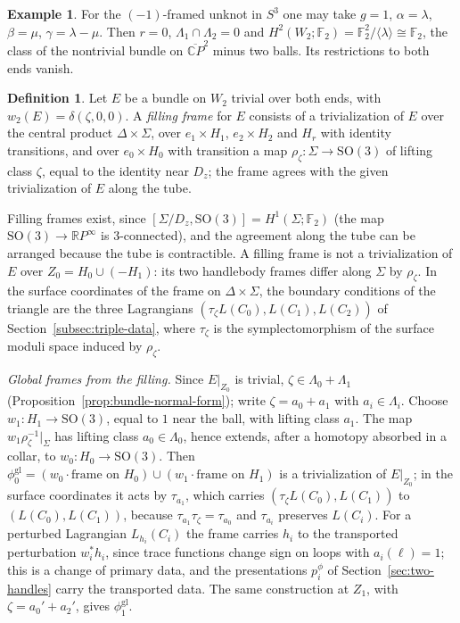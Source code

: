 \documentclass[11pt]{amsart}
\theoremstyle{definition}
\newtheorem{definition}[theorem]{Definition}
\newtheorem{example}[theorem]{Example}
\theoremstyle{remark}
\theoremstyle{plain}
\numberwithin{equation}{section}
\newcommand{\RR}{\mathbb{R}}
\newcommand{\CC}{\mathbb{C}}
\newcommand{\FF}{\mathbb{F}_2}
\newcommand{\SO}{\mathrm{SO}}
\begin{document}
\begin{example}
For the $(-1)$-framed unknot in $S^3$ one may take $g=1$,
$\alpha=\lambda$, $\beta=\mu$, $\gamma=\lambda-\mu$. Then $r=0$,
$\Lambda_1\cap \Lambda_2=0$ and $H^2(W_2;\FF)=\FF^2/\langle\lambda\rangle\cong\FF$,
the class of the nontrivial bundle on $\overline{\CC P}^2$ minus two
balls. Its restrictions to both ends vanish.
\end{example}

\begin{definition}\label{def:normal-form}
Let $E$ be a bundle on $W_2$ trivial over both ends, with
$w_2(E)=\delta(\zeta,0,0)$. A \emph{filling frame} for $E$ consists of a
trivialization of $E$ over the central product $\Delta\times\Sigma$, over
$e_1\times H_1$, $e_2\times H_2$ and $H_r$ with identity transitions, and
over $e_0\times H_0$ with transition a map $\rho_\zeta\colon\Sigma\to\SO(3)$ of
lifting class $\zeta$, equal to the identity near $D_z$; the frame agrees with
the given trivialization of $E$ along the tube.
\end{definition}

Filling frames exist, since $[\Sigma/D_z,\SO(3)]=H^1(\Sigma;\FF)$ (the map
$\SO(3)\to\RR P^\infty$ is $3$-connected), and the agreement along the tube can be
arranged because the tube is contractible. A filling frame is not a
trivialization of $E$ over $Z_0=H_0\cup(-H_1)$: its two handlebody frames
differ along $\Sigma$ by $\rho_\zeta$. In the surface coordinates of the frame
on $\Delta\times\Sigma$, the boundary conditions of the triangle are the three
Lagrangians $(\tau_\zeta L(C_0),L(C_1),L(C_2))$ of
Section~\ref{subsec:triple-data}, where $\tau_\zeta$ is the symplectomorphism
of the surface moduli space induced by $\rho_\zeta$.

\emph{Global frames from the filling.} Since $E|_{Z_0}$ is trivial,
$\zeta\in \Lambda_0+\Lambda_1$ (Proposition~\ref{prop:bundle-normal-form}); write
$\zeta=a_0+a_1$ with $a_i\in \Lambda_i$. Choose $w_1\colon H_1\to\SO(3)$, equal to $1$
near the ball, with lifting class $a_1$. The map $w_1\rho_\zeta^{-1}|_\Sigma$ has
lifting class $a_0\in \Lambda_0$, hence extends, after a homotopy absorbed in a collar,
to $w_0\colon H_0\to\SO(3)$. Then $\phi_0^{\mathrm{gl}}=(w_0\cdot\text{frame on }
H_0)\cup(w_1\cdot\text{frame on }H_1)$ is a trivialization of $E|_{Z_0}$; in the
surface coordinates it acts by $\tau_{a_1}$, which carries
$(\tau_\zeta L(C_0),L(C_1))$ to $(L(C_0),L(C_1))$, because
$\tau_{a_1}\tau_\zeta=\tau_{a_0}$ and $\tau_{a_i}$ preserves $L(C_i)$. For a
perturbed Lagrangian $L_{h_i}(C_i)$ the frame carries $h_i$ to the transported
perturbation $w_i^*h_i$, since trace functions change sign on loops with
$a_i(\ell)=1$; this is a change of primary data, and the presentations
$p_i^\phi$ of Section~\ref{sec:two-handles} carry the transported data. The same
construction at $Z_1$, with $\zeta=a_0'+a_2'$, gives $\phi_1^{\mathrm{gl}}$.
\end{document}
